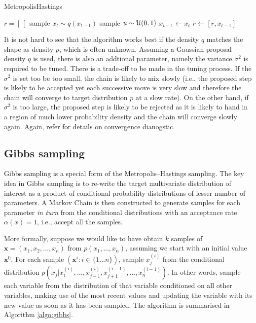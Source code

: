 \begin{algorithm}
\caption{MetropolisHastings}\label{algo:metropolishastings}
\begin{algorithmic}[1]
\State $r = [\ ]$
\Repeat
  \State sample $x_t \sim q(x_{t-1})$
  \State sample $u \sim {\cal U}(0,1)$
    \State $x_{t-1} \gets x_{t}$
    \State $r \gets [r,x_{t-1}]$
  \EndIf
{}
\EndFunction
\end{algorithmic}
\end{algorithm}

It is not hard to see that the algorithm works best if the density $q$ matches the shape as density $p$, which is often unknown. Assuming a Gaussian proposal density $q$ is used, there is also an addtional parameter, namely the variance $\sigma^2$ is required to be tuned. There is a trade-off to be made in the tuning process. If the $\sigma^2$ is set too be too small, the chain is likely to mix slowly (i.e., the proposed step is likely to be accepted yet each successive move is very slow and therefore the chain will converge to target distribution $p$ at a slow rate). On the other hand, if $\sigma^2$ is too large, the proposed step is likely to be rejected as it is likely to hand in a region of much lower probability density and the chain will converge slowly again. Again, refer \cite{RCP05} for details on convergence dianogstic.

\subsection{Gibbs sampling}
Gibbs sampling \cite{GS84} is a special form of the Metropolis–Hastings sampling. The key idea in Gibbs sampling is to re-write the target multivariate distribution of interest as a product of conditional probability distributions of lesser number of parameters. A Markov Chain is then constructed to generate samples for each parameter \emph{in turn} from the conditional distributions with an acceptance rate $\alpha(x)=1$, i.e., accept all the samples.

More formally, suppose we would like to have obtain $k$ samples of $\mathbf{x}=(x_1,x_2,\ldots, x_n)$ from $p(x_1, \ldots, x_n)$, assuming we start with an initial value $\mathbf{x}^{0}$. For each sample $(\mathbf{x}^{i}: i \in \{1 \dots n\})$, sample $x_j^{(i)}$ from the conditional distribution $p(x_j|x_1^{(i)},\dots,x_{j-1}^{(i)},x_{j+1}^{(i-1)},\dots,x_n^{(i-1)})$. In other words, sample each variable from the distribution of that variable conditioned on all other variables, making use of the most recent values and updating the variable with its new value as soon as it has been sampled. The algorithm is summarised in Algorithm \ref{algo:gibbs}.

